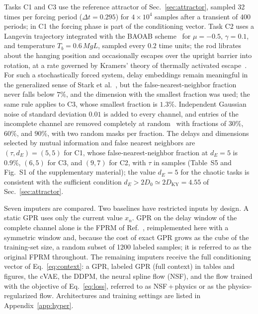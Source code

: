 Tasks C1 and C3 use the reference attractor of Sec.~\ref{sec:attractor}, sampled 32 times per forcing period ($\Delta t=0.295$) for $4\times10^{4}$ samples after a transient of 400 periods; in C1 the forcing phase is part of the conditioning vector. Task C2 uses a Langevin trajectory integrated with the BAOAB scheme~\cite{LeimkuhlerMatthews2013} for $\mu=-0.5$, $\gamma=0.1$, and temperature $T_b=0.6\,MgL$, sampled every $0.2$ time units; the rod librates about the hanging position and occasionally escapes over the upright barrier into rotation, at a rate governed by Kramers' theory of thermally activated escape~\cite{Kramers1940}. For such a stochastically forced system, delay embeddings remain meaningful in the generalized sense of Stark et al.~\cite{Stark2003}, but the false-nearest-neighbor fraction never falls below $7\%$, and the dimension with the smallest fraction was used; the same rule applies to C3, whose smallest fraction is $1.3\%$. Independent Gaussian noise of standard deviation $0.01$ is added to every channel, and entries of the incomplete channel are removed completely at random~\cite{LittleRubin2019} with fractions of $30\%$, $60\%$, and $90\%$, with two random masks per fraction. The delays and dimensions selected by mutual information and false nearest neighbors are $(\tau,d_E)=(5,5)$ for C1, whose false-nearest-neighbor fraction at $d_E=5$ is $0.9\%$, $(6,5)$ for C3, and $(9,7)$ for C2, with $\tau$ in samples (Table~S5 and Fig.~S1 of the supplementary material); the value $d_E=5$ for the chaotic tasks is consistent with the sufficient condition $d_E>2D_0\simeq2D_{\mathrm{KY}}=4.55$ of Sec.~\ref{sec:attractor}.

Seven imputers are compared. Two baselines have restricted inputs by design. A static GPR uses only the current value $x_n$. GPR on the delay window of the complete channel alone is the FPRM of Ref.~, reimplemented here with a symmetric window and, because the cost of exact GPR grows as the cube of the training-set size, a random subset of 1200 labeled samples; it is referred to as the original FPRM throughout. The remaining imputers receive the full conditioning vector of Eq.~\eqref{eq:context}: a GPR, labeled GPR (full context) in tables and figures, the cVAE, the DDPM, the neural spline flow (NSF), and the flow trained with the objective of Eq.~\eqref{eq:loss}, referred to as NSF\,+\,physics or as the physics-regularized flow. Architectures and training settings are listed in Appendix~\ref{app:hyper}.

